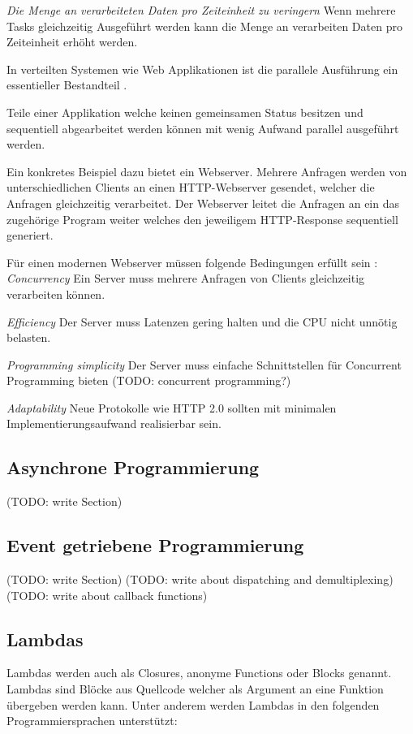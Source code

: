 \emph{Die Menge an verarbeiteten Daten pro Zeiteinheit zu veringern}
	Wenn mehrere Tasks gleichzeitig Ausgeführt werden kann die Menge an verarbeiten Daten pro Zeiteinheit erhöht werden.	

In verteilten Systemen wie Web Applikationen ist die parallele Ausführung ein essentieller Bestandteil \cite[p. 14]{Erb2012}. 

Teile einer Applikation welche keinen gemeinsamen Status besitzen und sequentiell abgearbeitet werden können mit wenig Aufwand parallel ausgeführt werden. \cite[p. 18]{Can08}

Ein konkretes Beispiel dazu bietet ein Webserver. Mehrere Anfragen werden von unterschiedlichen Clients an einen HTTP-Webserver gesendet, welcher die Anfragen gleichzeitig verarbeitet. Der Webserver leitet die Anfragen an ein das zugehörige Program weiter welches den jeweiligem HTTP-Response sequentiell generiert. \cite[p. 18]{Can08}

Für einen modernen Webserver müssen folgende Bedingungen erfüllt sein \cite[p. 2]{Sch97}: 
\label{Webserver_Requirements}
\emph{Concurrency}
	Ein Server muss mehrere Anfragen von Clients gleichzeitig verarbeiten können. 

\emph{Efficiency}
	Der Server muss Latenzen gering halten und die CPU nicht unnötig belasten. 

\emph{Programming simplicity}
	Der Server muss einfache Schnittstellen für Concurrent Programming bieten (TODO: concurrent programming?)

\emph{Adaptability}
	Neue Protokolle wie HTTP 2.0 sollten mit minimalen Implementierungsaufwand realisierbar sein.






\subsection{Asynchrone Programmierung}
(TODO: write Section)

\subsection{Event getriebene Programmierung}
(TODO: write Section)
(TODO: write about dispatching and demultiplexing)
(TODO: write about callback functions)

\subsection{Lambdas}
Lambdas werden auch als Closures, anonyme Functions oder Blocks genannt. Lambdas sind Blöcke aus Quellcode welcher als Argument an eine Funktion übergeben werden kann. Unter anderem werden Lambdas in den folgenden Programmiersprachen unterstützt:


